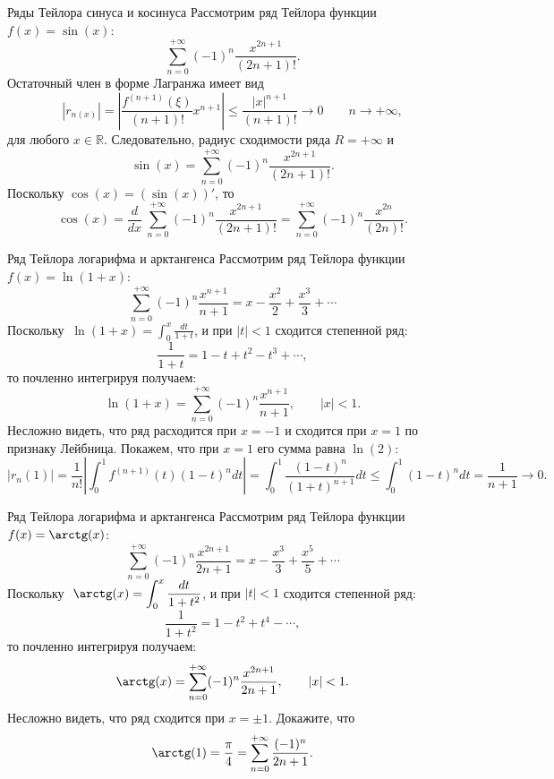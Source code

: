 \documentclass[8pt]{beamer}
\begin{document}
\begin{frame}{Ряды Тейлора синуса и косинуса}
Рассмотрим ряд Тейлора функции $ f(x) =\sin(x)$:
$$\sum_{n=0}^{+\infty} (-1)^n \frac{x^{2n+1}}{(2n+1)!}.$$
Остаточный член в форме Лагранжа имеет вид
$$|r_{n(x)}| = \left| \frac{f^{(n+1)}(\xi)}{(n+1)!}x^{n+1} \right| 
\le \frac{|x|^{n+1}}{(n+1)!} \to0 \qquad n\to+\infty,$$
для любого $x\in\mathbb{R}$. Следовательно, радиус сходимости ряда $R=+\infty$ и
$$\sin(x) = \sum_{n=0}^{+\infty}(-1)^n \frac{x^{2n+1}}{(2n+1)!}.$$
Поскольку $\cos(x) = (\sin(x))'$, то
$$\cos(x) = \frac{d}{dx}\ \sum_{n=0}^{+\infty}(-1)^n \frac{x^{2n+1}}{(2n+1)!} = \sum_{n=0}^{+\infty}(-1)^n \frac{x^{2n}}{(2n)!}.$$
\end{frame}

\begin{frame}{Ряд Тейлора логарифма и арктангенса}
Рассмотрим ряд Тейлора функции $ f(x) =\ln(1+x)$:
$$\sum_{n=0}^{+\infty}(-1)^n\frac{x^{n+1}}{n+1}= x-\frac{x^2}{2}+\frac{x^3}{3}+\cdots$$
Поскольку  $\ \displaystyle \ln(1+x) = \int_{0}^x\frac{dt}{1+t}$,
и при $|t|<1$ сходится степенной ряд:
$$\frac{1}{1+t} = 1-t+t^2-t^3+\cdots,$$
то почленно интегрируя получаем:
$$\ln(1+x) = \sum_{n=0}^{+\infty}(-1)^n\frac{x^{n+1}}{n+1},\qquad |x|<1.$$
Несложно видеть, что ряд расходится при $x=-1$ и  сходится при $x=1$ по признаку Лейбница. Покажем, что при $x=1$ его сумма равна $\ln(2)$:
$$|r_n(1)|=\frac{1}{n!}\left|\int_0^1 f^{(n+1)}(t)(1-t)^n dt\right|=
\int_0^1 \frac{(1-t)^n}{(1+t)^{n+1}} dt\le \int_0^1(1-t)^n dt = \frac{1}{n+1}\to0.$$
\end{frame}

\begin{frame}{Ряд Тейлора логарифма и арктангенса}
Рассмотрим ряд Тейлора функции $ f(x) =\arctg(x)$:
$$\sum_{n=0}^{+\infty}(-1)^n\frac{x^{2n+1}}{2n+1}= x-\frac{x^3}{3}+\frac{x^5}{5}+\cdots$$
Поскольку  $\ \displaystyle \arctg(x) = \int_{0}^x\frac{dt}{1+t^2}$,
и при $|t|<1$ сходится степенной ряд:
$$\frac{1}{1+t^2} = 1-t^2+t^4-\cdots,$$
то почленно интегрируя получаем:
$$\arctg(x) = \sum_{n=0}^{+\infty}(-1)^n\frac{x^{2n+1}}{2n+1},\qquad |x|<1.$$
Несложно видеть, что ряд сходится при $x=\pm1$. Докажите, что
$$\arctg(1) = \frac{\pi}{4} = \sum_{n=0}^{+\infty}\frac{(-1)^n}{2n+1}.$$
\end{frame}
\end{document}
